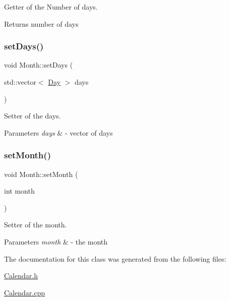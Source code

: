 Getter of the Number of days. 

\begin{DoxyReturn}{Returns}
number of days 
\end{DoxyReturn}
\mbox{\label{class_month_a816bb5d0a2d54283ece6924a7b54df36}} 
\subsubsection{\texorpdfstring{set\+Days()}{setDays()}}
{\footnotesize\ttfamily void Month\+::set\+Days (\begin{DoxyParamCaption}\item[{std\+::vector$<$ \mbox{\hyperlink{class_day}{Day}} $>$}]{days }\end{DoxyParamCaption})}



Setter of the days. 


\begin{DoxyParams}{Parameters}
{\em days} & -\/ vector of days \\
\hline
\end{DoxyParams}
\mbox{\label{class_month_a9f6e8f474768770ae897e53177eb1797}} 
\subsubsection{\texorpdfstring{set\+Month()}{setMonth()}}
{\footnotesize\ttfamily void Month\+::set\+Month (\begin{DoxyParamCaption}\item[{int}]{month }\end{DoxyParamCaption})}



Setter of the month. 


\begin{DoxyParams}{Parameters}
{\em month} & -\/ the month \\
\hline
\end{DoxyParams}


The documentation for this class was generated from the following files\+:\begin{DoxyCompactItemize}
\item 
\mbox{\hyperlink{_calendar_8h}{Calendar.\+h}}\item 
\mbox{\hyperlink{_calendar_8cpp}{Calendar.\+cpp}}\end{DoxyCompactItemize}
